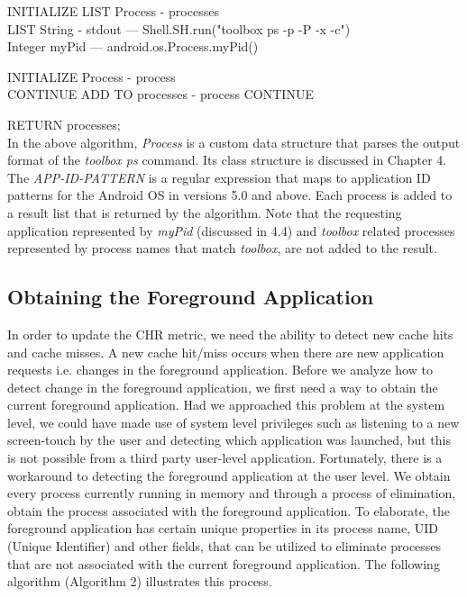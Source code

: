 \documentclass[12pt]{uthesis-v12}  %
\begin{document}
			\begin{algorithm}[H]
				\SetAlgoLined
				
				INITIALIZE LIST Process - processes\\
				LIST String - stdout --- Shell.SH.run("toolbox ps -p -P -x -c")\\
				Integer myPid 		 --- android.os.Process.myPid()
				
				{
					INITIALIZE Process - process\\
					{
						{
							CONTINUE
						}
						{
							ADD TO processes - process
						}
					}
					{
						CONTINUE
					}
				}
				
				RETURN processes;\\
			
			\caption[Algorithm to get list of processes in RAM]{In the above algorithm, {\em Process} is a custom data structure that parses the output format of the {\em toolbox ps} command. Its class structure is discussed in Chapter 4. The {\em APP-ID-PATTERN} is a regular expression that maps to application ID patterns for the Android OS in versions 5.0 and above. Each process is added to a result list that is returned by the algorithm. Note that the requesting application represented by {\em myPid} (discussed in 4.4) and {\em toolbox} related processes represented by process names that match {\em toolbox}, are not added to the result.}
			\end{algorithm}			
			
		\subsection{Obtaining the Foreground Application}
			In order to update the CHR metric, we need the ability to detect new cache hits and cache misses. A new cache hit/miss occurs when there are new application requests i.e. changes in the foreground application. Before we analyze how to detect change in the foreground application, we first need a way to obtain the current foreground application. Had we approached this problem at the system level, we could have made use of system level privileges such as listening to a new screen-touch by the user and detecting which application was  launched, but this is not possible from a third party user-level application. Fortunately, there is a workaround to detecting the foreground application at the user level. We obtain every process currently running in memory and through a process of elimination, obtain the process associated with the foreground application. To elaborate, the foreground application has certain unique properties in its process name, UID (Unique Identifier) and other fields, that can be utilized to eliminate processes that are not associated with the current foreground application. The following   algorithm (Algorithm 2) illustrates this process.
			
\end{document}
